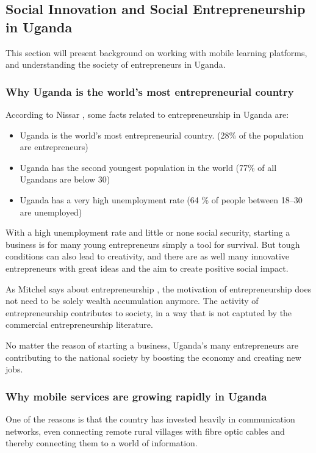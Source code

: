 \subsection{Social Innovation and Social Entrepreneurship in Uganda} %

    This section will present background on working with mobile learning platforms, and understanding the society of entrepreneurs in Uganda.

    \subsubsection{Why Uganda is the world's most entrepreneurial country}
    According to Nissar \citep{nissar}, some facts related to entrepreneurship in Uganda are:

    \begin{itemize}
      \item Uganda is the world's most entrepreneurial country. (28\% of the population are entrepreneurs)
        \item Uganda has the second youngest population in the world (77\% of all Ugandans are below 30)
        \item Uganda has a very high unemployment rate (64 \% of people between 18–30 are unemployed)
    \end{itemize}


    With a high unemployment rate and little or none social security, starting a business is for many young entrepreneurs simply a tool for survival. But tough conditions can also lead to creativity, and there are as well many innovative entrepreneurs with great ideas and the aim to create positive social impact.

    As Mitchel says about entrepreneurship \citep{mitchel}, the motivation of entrepreneurship does not need to be solely wealth accumulation anymore. The activity of entrepreneurship contributes to society, in a way that is not captuted by the commercial entrepreneurship literature.

    No matter the reason of starting a business, Uganda's many entrepreneurs are contributing to the national society by boosting the economy and creating new jobs.

    \subsubsection{Why mobile services are growing rapidly in Uganda}
    One of the reasons is that the country has invested heavily in communication networks, even connecting remote rural villages with fibre optic cables and thereby connecting them to a world of information.

